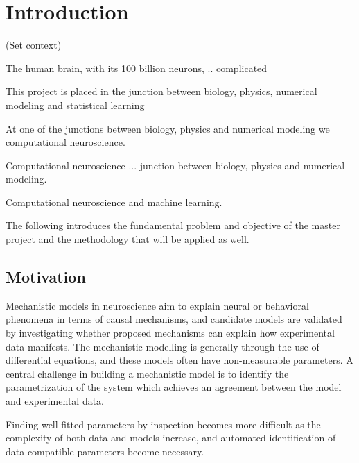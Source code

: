 \chapter{Introduction}

(Set context)

The human brain, with its 100 billion neurons, .. complicated 

This project is placed in the junction between biology, physics, numerical modeling and statistical learning 


At one of the junctions between biology, physics and numerical modeling we computational neuroscience. 

Computational neuroscience ... junction between biology, physics and numerical modeling. 

Computational neuroscience and machine learning. 

The following introduces the fundamental problem and objective of the master project and the methodology that will be applied as well.

\section{Motivation}\label{sec:Motivation}

Mechanistic models in neuroscience aim to explain neural or behavioral phenomena in terms of causal mechanisms, and candidate models are validated by investigating whether proposed mechanisms can explain how experimental data manifests. The mechanistic modelling is generally through the use of differential equations, and these models often have non-measurable parameters. A central challenge in building a mechanistic model is to identify the parametrization of the system which achieves an agreement between the model and experimental data. 

Finding well-fitted parameters by inspection becomes more difficult as the complexity of both data and models increase, and automated identification of data-compatible parameters become necessary. 

